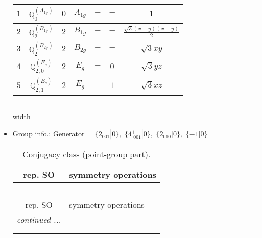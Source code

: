 \documentclass[fleqn,10pt,landscape]{article}
\begin{document}
\begin{itemize}
\begin{center}
\begin{longtable}{ccccccc}
$ 1 $ & $ \mathbb{Q}_{0}^{(A_{1g})} $ & $ 0 $ & $ A_{1g} $ & $ - $ & $ - $ & $ 1 $ \\ \hline
$ 2 $ & $ \mathbb{Q}_{2}^{(B_{1g})} $ & $ 2 $ & $ B_{1g} $ & $ - $ & $ - $ & $ \frac{\sqrt{3} \left(x - y\right) \left(x + y\right)}{2} $ \\
$ 3 $ & $ \mathbb{Q}_{2}^{(B_{2g})} $ & $ 2 $ & $ B_{2g} $ & $ - $ & $ - $ & $ \sqrt{3} x y $ \\
$ 4 $ & $ \mathbb{Q}_{2,0}^{(E_{g})} $ & $ 2 $ & $ E_{g} $ & $ - $ & $ 0 $ & $ \sqrt{3} y z $ \\
$ 5 $ & $ \mathbb{Q}_{2,1}^{(E_{g})} $ & $ 2 $ & $ E_{g} $ & $ - $ & $ 1 $ & $ \sqrt{3} x z $ \\
\end{longtable}
\end{center}

 \hfil \hrule height 1mm width \textwidth \hfil

\item Group info.: Generator = $\{2{}_{001}|0\},\,\,\{4^{+}_{\,\,001}|0\},\,\,\{2{}_{010}|0\},\,\,\{-1|0\}$

\begin{center}
\renewcommand{\arraystretch}{1.3}
\begin{longtable}{c|l}
\caption{Conjugacy class (point-group part).}
 \\
 \hline \hline
rep. SO & symmetry operations \\ \hline \endfirsthead

\multicolumn{1}{l}{\tablename\ \thetable{}} \\
 \hline \hline
rep. SO & symmetry operations \\ \hline \endhead

 \hline \hline
\multicolumn{1}{r}{\footnotesize\it continued ...} \\ \endfoot

 \hline \hline
\multicolumn{1}{r}{} \\ \endlastfoot


\end{longtable}
\end{center}
\end{itemize}
\end{document}
